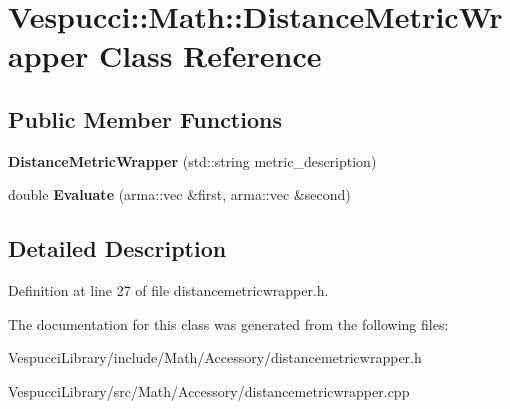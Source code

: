 \hypertarget{class_vespucci_1_1_math_1_1_distance_metric_wrapper}{}\section{Vespucci\+:\+:Math\+:\+:Distance\+Metric\+Wrapper Class Reference}
\label{class_vespucci_1_1_math_1_1_distance_metric_wrapper}
\subsection*{Public Member Functions}
\begin{DoxyCompactItemize}
\item 
{\bfseries Distance\+Metric\+Wrapper} (std\+::string metric\+\_\+description)\hypertarget{class_vespucci_1_1_math_1_1_distance_metric_wrapper_ab06269d2b9546a7bd11b24ee26e524ba}{}\label{class_vespucci_1_1_math_1_1_distance_metric_wrapper_ab06269d2b9546a7bd11b24ee26e524ba}

\item 
double {\bfseries Evaluate} (arma\+::vec \&first, arma\+::vec \&second)\hypertarget{class_vespucci_1_1_math_1_1_distance_metric_wrapper_a5d50b09c4f454f6dd0caf855a97318e0}{}\label{class_vespucci_1_1_math_1_1_distance_metric_wrapper_a5d50b09c4f454f6dd0caf855a97318e0}

\end{DoxyCompactItemize}


\subsection{Detailed Description}


Definition at line 27 of file distancemetricwrapper.\+h.



The documentation for this class was generated from the following files\+:\begin{DoxyCompactItemize}
\item 
Vespucci\+Library/include/\+Math/\+Accessory/distancemetricwrapper.\+h\item 
Vespucci\+Library/src/\+Math/\+Accessory/distancemetricwrapper.\+cpp\end{DoxyCompactItemize}
